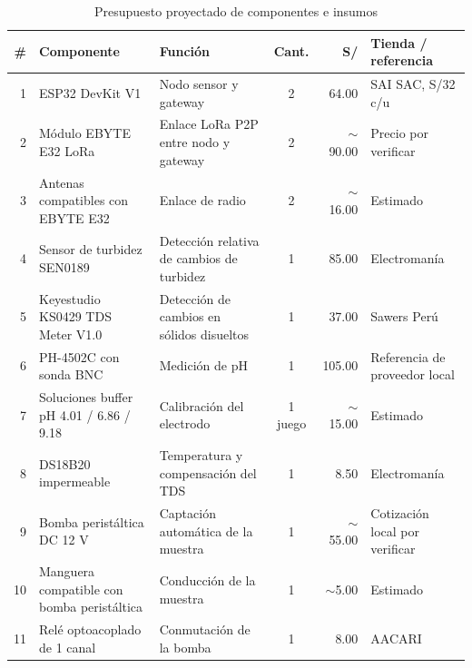 \documentclass[11pt,a4paper]{article}
\renewcommand{\arraystretch}{1.2}
\begin{document}
{\footnotesize
\renewcommand{\arraystretch}{1.0}

\begin{longtable}{r p{4.2cm}p{4.1cm}c r p{3.2cm}}

\caption{Presupuesto proyectado de componentes e insumos}
\label{tab:presupuesto} \\

\toprule
\# &
Componente &
Función &
Cant. &
S/ &
Tienda / referencia \\
\midrule
\endhead

1 &
ESP32 DevKit V1 \cite{esp32} &
Nodo sensor y gateway &
2 &
64.00 &
SAI SAC, S/32 c/u \\

2 &
Módulo EBYTE E32 LoRa \cite{ebyteE32} &
Enlace LoRa P2P entre nodo y gateway &
2 &
$\sim$90.00 &
Precio por verificar \\

3 &
Antenas compatibles con EBYTE E32 &
Enlace de radio &
2 &
$\sim$16.00 &
Estimado \\

4 &
Sensor de turbidez SEN0189 \cite{turb} &
Detección relativa de cambios de turbidez &
1 &
85.00 &
Electromanía \\

5 &
Keyestudio KS0429 TDS Meter V1.0 \cite{tds} &
Detección de cambios en sólidos disueltos &
1 &
37.00 &
Sawers Perú \\

6 &
PH-4502C con sonda BNC &
Medición de pH &
1 &
105.00 &
Referencia de proveedor local \\

7 &
Soluciones buffer pH 4.01 / 6.86 / 9.18 &
Calibración del electrodo &
1 juego &
$\sim$15.00 &
Estimado \\

8 &
DS18B20 impermeable \cite{ds18} &
Temperatura y compensación del TDS &
1 &
8.50 &
Electromanía \\

9 &
Bomba peristáltica DC 12 V &
Captación automática de la muestra &
1 &
$\sim$55.00 &
Cotización local por verificar \\

10 &
Manguera compatible con bomba peristáltica &
Conducción de la muestra &
1 &
$\sim$5.00 &
Estimado \\

11 &
Relé optoacoplado de 1 canal &
Conmutación de la bomba &
1 &
8.00 &
AACARI \\


\end{longtable}}
\end{document}
